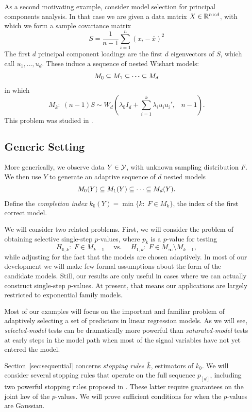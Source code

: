 \documentclass{article}
\begin{document}
\begin{example}
  As a second motivating example, consider model selection for   principal components analysis. In that case we are given a data matrix $X \in \mathbb{R}^{n\times d}$, with which we form a sample covariance matrix
\[
S = \frac{1}{n-1} \sum_{i=1}^n(x_i - \bar x)^2
\]
The first $d$ principal component loadings are the first $d$ eigenvectors of $S$, which call $u_1,\ldots, u_d$. These induce a sequence of nested Wishart models:
\[
M_0 \subseteq M_1 \subseteq \cdots \subseteq M_d
\]
in which
\begin{equation}
  M_k:\; (n-1) S \sim W_d\left(\lambda_0 I_d + \sum_{i=1}^k     \lambda_i u_i u_i', \;\;\; n-1\right).
\end{equation}
This problem was studied in \citet{choi2014selecting}.
\end{example}

\subsection{Generic Setting}

More generically, we observe data $Y \in \mathcal{Y}$, with unknown sampling distribution $F$. We then use $Y$ to generate an adaptive sequence of $d$ nested models
\[
M_0(Y) \subseteq M_1(Y) \subseteq \cdots \subseteq M_d(Y).
\]
Define the {\em completion index} $k_0(Y) = \min\{k:\; F \in M_k\}$, the index of the first correct model. 

We will consider two related problems. First, we will consider the problem of obtaining selective single-step $p$-values, where $p_k$ is a $p$-value for testing
\[
H_{0,k}:\; F\in M_{k-1}\quad \text{ vs. } \quad 
H_{1,k}:\; F\in M_\infty\setminus M_{k-1},
\]
while adjusting for the fact that the models are chosen adaptively. In most of our development we will make few formal assumptions about the form of the candidate models. Still, our results are only useful in cases where we can actually construct single-step $p$-values. At present, that means our applications are largely restricted to exponential family models.

Most of our examples will focus on the important and familiar problem of adaptively selecting a set of predictors in linear regression models. As we will see, {\em selected-model} tests can be dramatically more powerful than {\em saturated-model} tests at early steps in the model path when most of the signal variables have not yet entered the model.

Section~\ref{sec:sequential} concerns {\em stopping rules} $\hat{k}$, estimators of $k_0$. We will consider several stopping rules that operate on the full sequence $p_{[d]}$, including two powerful stopping rules proposed in \citet{gsell2013sequential}. These latter require guarantees on the joint law of the $p$-values. We will prove sufficient conditions for when the $p$-values are Gaussian.
\end{document}
